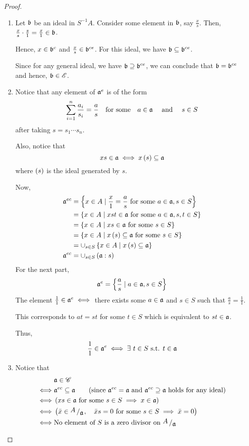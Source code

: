 \begin{proof} \
	\begin{enumerate}
		\item
		Let \(\mathfrak{b}\) be an ideal in \(S^{-1}A\).
		Consider some element in \(\mathfrak{b}\), say \(\frac{x}{s}\).
		Then, \(\frac{x}{s} \cdot \frac{s}{1} = \frac{x}{1} \in \mathfrak{b}\).

		Hence, \(x \in \mathfrak{b}^c\) and \(\frac{x}{s} \in \mathfrak{b}^{ce}\).
		For this ideal, we have \(\mathfrak{b} \subseteq \mathfrak{b}^{ce}\).

		Since for any general ideal, we have
		\(\mathfrak{b} \supseteq \mathfrak{b}^{ce}\), we can conclude that
		\(\mathfrak{b} = \mathfrak{b}^{ce}\) and hence, \(\mathfrak{b} \in {\mathscr{E}}\).

		\item
		Notice that any element of \(\mathfrak{a}^{e}\) is of the form
		\[
			\sum_{i=1}^{n} \frac{a_i}{s_i}
			= \frac{a}{s} \quad \text{for some} \quad a \in \mathfrak{a}
			\quad \text{ and } \quad s \in S
		\]
		after taking \(s = s_1 \cdots s_n\).

		Also, notice that
		\[
			xs \in \mathfrak{a} \iff x \left( s \right) \subseteq \mathfrak{a}
		\]
		where \(\left( s \right)\) is the ideal generated by \(s\).

		Now,
		\begin{align*}
			\mathfrak{a}^{ec} &= \left\{ x \in A \mid \frac{x}{1} = \frac{a}{s}
				\text{ for some } a \in \mathfrak{a}, s \in S \right\} \\
			&= \left\{ x \in A \mid xst \in \mathfrak{a} \text{ for some } a \in \mathfrak{a},
				s, t \in S \right\} \\
			&= \left\{ x \in A \mid xs \in \mathfrak{a} \text{ for some } s \in S \right\} \\
			&= \left\{ x \in A \mid x \left( s \right) \subseteq \mathfrak{a}
				\text{ for some } s \in S \right\} \\
			&= \cup_{s \in S} \left\{ x \in A \mid x \left( s \right) \subseteq \mathfrak{a} \right\} \\
			\mathfrak{a}^{ec} &= \cup_{s \in S} \left( \mathfrak{a} : s \right)
		\end{align*}
		For the next part,
		\[
			\mathfrak{a}^{e} = \left\{ \frac{a}{s} \mid a \in \mathfrak{a}, s \in S \right\}
		\]
		The element \(\frac{1}{1} \in \mathfrak{a}^{e} \iff\)
		there exists some \(a \in \mathfrak{a}\) and \(s \in S\) such that
		\(\frac{a}{s} = \frac{1}{1}\).

		This corresponds to \(at = st\) for some \(t \in S\)
		which is equivalent to \(st \in \mathfrak{a}\).

		Thus,
		\[
			\frac{1}{1} \in \mathfrak{a}^{e} \iff \exists\ t \in S \text{ s.t. } t \in \mathfrak{a}
		\]

		\item Notice that
		\begin{align*}
			& \mfa \in \sC \\
			\iff & \mfa^{ec} \subseteq \mfa \quad\quad (\text{since }
				\mfa^{ec} = \mfa \AND \mfa^{ec} \supseteq \mfa
				\text{ holds for any ideal}) \\
			\iff & \brak{xs \in \mfa \text{ for some } s \in S
				\implies x \in \mfa} \\
			\iff & \brak{\bar{x} \in \bigslant{A}{\mfa}, \quad
				\bar{x}s = 0 \text{ for some } s \in S
				\implies \bar{x} = 0} \\
			\iff & \text{No element of } S \text{ is a zero divisor on }
				\bigslant{A}{\mfa}
		\end{align*}


\end{enumerate}
\end{proof}
